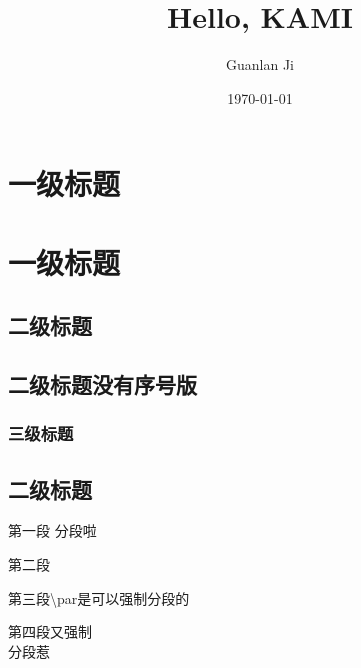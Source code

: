 \documentclass[utf8]{ctexart}
\title{Hello, KAMI}
\author{Guanlan Ji}
\date{\today}
\begin{document}
\maketitle %

\tableofcontents

\section{一级标题}
\section{一级标题}
\subsection{二级标题}
\subsection*{二级标题没有序号版}
\subsubsection{三级标题}
\subsection{二级标题}
第一段
分段啦

第二段

第三段\textbackslash par是可以强制分段的 %

第四段又强制\\分段惹
\end{document}

